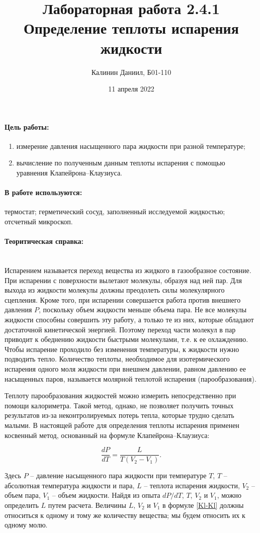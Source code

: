 \documentclass[a4paper, 12pt]{article}
\author{Калинин Даниил, Б01-110}
\date{11 апреля 2022}
\title{Лабораторная работа 2.4.1\\Определение теплоты испарения жидкости}
\newcommand{\parag}[1]{\paragraph*{#1:}}
\begin{document}
\maketitle

\parag {Цель работы}
\begin{enumerate}
	\item измерение давления насыщенного пара жидкости при разной температуре;
	\item вычисление по полученным данным теплоты испарения с помощью уравнения Клапейрона–Клаузиуса.
\end{enumerate}

\parag {В работе используются}
термостат; герметический сосуд, заполненный исследуемой жидкостью; отсчетный микроскоп.

\parag {Теоритическая справка} ~\\
Испарением называется переход вещества из жидкого в газообразное состояние. При испарении с поверхности вылетают молекулы, образуя над ней пар. Для выхода из жидкости молекулы должны преодолеть силы молекулярного сцепления. Кроме того, при испарении совершается работа против внешнего давления $ P $, поскольку объем жидкости меньше объема пара. Не все молекулы жидкости способны совершить эту работу, а только те из них, которые обладают достаточной кинетической энергией. Поэтому переход части молекул в пар приводит к обеднению жидкости быстрыми молекулами, т.е. к ее охлаждению. Чтобы испарение проходило без изменения температуры, к жидкости нужно подводить тепло. Количество теплоты, необходимое для изотермического испарения одного моля жидкости при внешнем давлении, равном давлению ее насыщенных паров, называется молярной теплотой испарения (парообразования).

Теплоту парообразования жидкостей можно измерить непосредственно при помощи калориметра. Такой метод, однако, не позволяет получить точных результатов из-за неконтролируемых потерь тепла, которые трудно сделать малыми. В настоящей работе для определения теплоты испарения применен косвенный метод, основанный на формуле Клапейрона–Клаузиуса:

\begin{equation}\label{Kl-Kl}
\frac{dP}{dT}=\frac{L}{T\left(V_2-V_1\right)}.
\end{equation}

Здесь $ P $ -- давление насыщенного пара жидкости при температуре $ T $, $ T $ -- абсолютная температура жидкости и пара, $ L $ -- теплота испарения жидкости, $ V_2 $ -- объем пара, $ V_1 $ -- объем жидкости. Найдя из опыта $ dP/dT $, $ T $, $ V_2 $ и $ V_1 $, можно определить $ L $ путем расчета. Величины $ L $, $ V_2 $ и $ V_1 $ в формуле \eqref{Kl-Kl} должны относиться к одному и тому же количеству вещества; мы будем относить их к одному молю.
\end{document}
